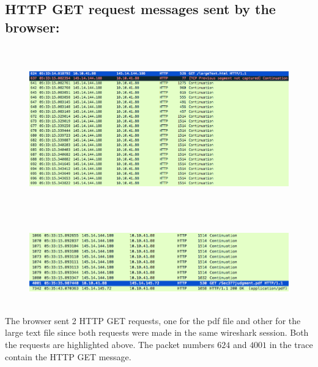 \documentclass[]{report}
\begin{document}
\subsection{HTTP GET request messages sent by the browser:}
\begin{figure}[H]
	\vspace{0pt}
	\includegraphics[height = 200pt, keepaspectratio]{Snapshots/q3/3_1.png}
\end{figure}
\begin{figure}[H]
	\vspace{0pt}
	\includegraphics[height = 100pt, keepaspectratio]{Snapshots/q3/3_2.png}
\end{figure}
The browser sent 2 HTTP GET requests, one for the pdf file and other for the large text file since both requests were made in the same wireshark session. Both the requests are highlighted above. The packet numbers $624$ and $4001$ in the trace contain the HTTP GET message. 
\end{document}
